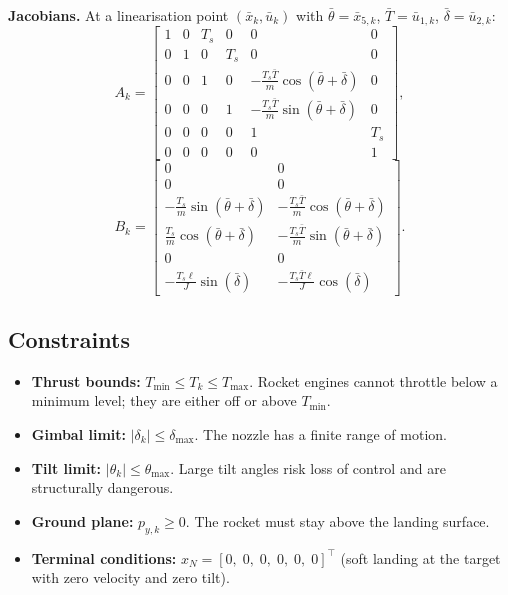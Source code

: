 \textbf{Jacobians.} At a linearisation point $(\bar{x}_k, \bar{u}_k)$ with $\bar{\theta} = \bar{x}_{5,k}$, $\bar{T} = \bar{u}_{1,k}$, $\bar{\delta} = \bar{u}_{2,k}$:
\[
A_k = \begin{bmatrix}
	1 & 0 & T_s & 0 & 0 & 0 \\
	0 & 1 & 0 & T_s & 0 & 0 \\
	0 & 0 & 1 & 0 & -\frac{T_s \bar{T}}{m}\cos(\bar{\theta}+\bar{\delta}) & 0 \\
	0 & 0 & 0 & 1 & -\frac{T_s \bar{T}}{m}\sin(\bar{\theta}+\bar{\delta}) & 0 \\
	0 & 0 & 0 & 0 & 1 & T_s \\
	0 & 0 & 0 & 0 & 0 & 1
\end{bmatrix},
\]
\[
B_k = \begin{bmatrix}
	0 & 0 \\
	0 & 0 \\
	-\frac{T_s}{m}\sin(\bar{\theta}+\bar{\delta}) & -\frac{T_s \bar{T}}{m}\cos(\bar{\theta}+\bar{\delta}) \\[3pt]
	\frac{T_s}{m}\cos(\bar{\theta}+\bar{\delta}) & -\frac{T_s \bar{T}}{m}\sin(\bar{\theta}+\bar{\delta}) \\[3pt]
	0 & 0 \\
	-\frac{T_s \ell}{J}\sin(\bar{\delta}) & -\frac{T_s \bar{T}\ell}{J}\cos(\bar{\delta})
\end{bmatrix}.
\]

\subsection{Constraints}

\begin{itemize}[nosep]
	\item \textbf{Thrust bounds:} $T_{\min} \le T_k \le T_{\max}$. Rocket engines cannot throttle below a minimum level; they are either off or above $T_{\min}$.
	\item \textbf{Gimbal limit:} $|\delta_k| \le \delta_{\max}$. The nozzle has a finite range of motion.
	\item \textbf{Tilt limit:} $|\theta_k| \le \theta_{\max}$. Large tilt angles risk loss of control and are structurally dangerous.
	\item \textbf{Ground plane:} $p_{y,k} \ge 0$. The rocket must stay above the landing surface.
	\item \textbf{Terminal conditions:} $x_N = [0,\; 0,\; 0,\; 0,\; 0,\; 0]^\top$ (soft landing at the target with zero velocity and zero tilt).
\end{itemize}

